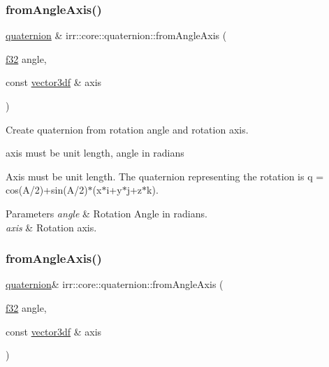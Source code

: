 \subsubsection{\texorpdfstring{from\+Angle\+Axis()}{fromAngleAxis()}\hspace{0.1cm}{\footnotesize\ttfamily [1/2]}}
{\footnotesize\ttfamily \hyperlink{classirr_1_1core_1_1quaternion}{quaternion} \& irr\+::core\+::quaternion\+::from\+Angle\+Axis (\begin{DoxyParamCaption}\item[{\hyperlink{namespaceirr_a0277be98d67dc26ff93b1a6a1d086b07}{f32}}]{angle,  }\item[{const \hyperlink{namespaceirr_1_1core_ae6e2b2a6c552833ebbd5b7463d03586b}{vector3df} \&}]{axis }\end{DoxyParamCaption})\hspace{0.3cm}{\ttfamily [inline]}}



Create quaternion from rotation angle and rotation axis. 

axis must be unit length, angle in radians

Axis must be unit length. The quaternion representing the rotation is q = cos(A/2)+sin(A/2)$\ast$(x$\ast$i+y$\ast$j+z$\ast$k). 
\begin{DoxyParams}{Parameters}
{\em angle} & Rotation Angle in radians. \\
\hline
{\em axis} & Rotation axis. \\
\hline
\end{DoxyParams}
\mbox{\label{classirr_1_1core_1_1quaternion_a143d372d1289c811ec653e2b3bfc87d3}} 
\subsubsection{\texorpdfstring{from\+Angle\+Axis()}{fromAngleAxis()}\hspace{0.1cm}{\footnotesize\ttfamily [2/2]}}
{\footnotesize\ttfamily \hyperlink{classirr_1_1core_1_1quaternion}{quaternion}\& irr\+::core\+::quaternion\+::from\+Angle\+Axis (\begin{DoxyParamCaption}\item[{\hyperlink{namespaceirr_a0277be98d67dc26ff93b1a6a1d086b07}{f32}}]{angle,  }\item[{const \hyperlink{namespaceirr_1_1core_ae6e2b2a6c552833ebbd5b7463d03586b}{vector3df} \&}]{axis }\end{DoxyParamCaption})}



